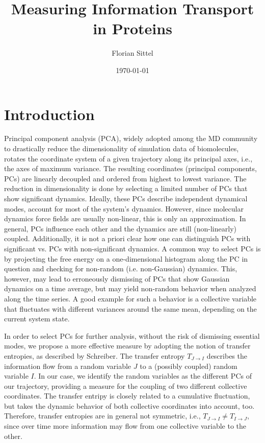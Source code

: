 \documentclass[12pt,a4paper,twoside,english,fleqn,preprint,aps,prb]{revtex4}
\begin{document}
\author{Florian Sittel} 
\title{Measuring Information Transport in Proteins}
\date{\today}

\begingroup
 \let\clearpage\relax
 \maketitle
\endgroup

\tableofcontents
\clearpage


\section{Introduction}
Principal component analysis (PCA), widely adopted among the MD community to
drastically reduce the dimensionality of simulation data of biomolecules,
rotates the coordinate system of a given trajectory along its principal axes,
i.e., the axes of maximum variance.  The resulting coordinates (principal
components, PCs) are linearly decoupled and ordered from highest to lowest
variance.  The reduction in dimensionality is done by selecting a limited
number of PCs that show significant dynamics.  Ideally, these PCs describe
independent dynamical modes, account for most of the system's dynamics.
However, since molecular dynamics force fields are usually non-linear, this is
only an approximation.  In general, PCs influence each other and the dynamics
are still (non-linearly) coupled.  Additionally, it is not a priori clear how
one can distinguish PCs with significant vs. PCs with non-significant dynamics.
A common way to select PCs is by projecting the free energy on a
one-dimensional histogram along the PC in question and checking for non-random
(i.e. non-Gaussian) dynamics.  This, however, may lead to erroneously
dismissing of PCs that show Gaussian dynamics on a time average, but may yield
non-random behavior when analyzed along the time series.  A good example for
such a behavior is a collective variable that fluctuates with different
variances around the same mean, depending on the current system state.

In order to select PCs for further analysis, without the risk of dismissing
essential modes, we propose a more effective measure by adopting the notion of
transfer entropies, as described by Schreiber.\cite{Schreiber2000} The transfer
entropy $T_{J \rightarrow I}$ describes the information flow from a random
variable $J$ to a (possibly coupled) random variable $I$.  In our case, we
identify the random variables as the different PCs of our trajectory, providing
a measure for the coupling of two different collective coordinates.  The
transfer entripy is closely related to a cumulative fluctuation, but takes the
dynamic behavior of both collective coordinates into account, too.  Therefore,
transfer entropies are in general not symmetric, i.e., $T_{J \rightarrow I}
\not= T_{I \rightarrow J}$, since over time more information may flow from one
collective variable to the other.
\end{document}
